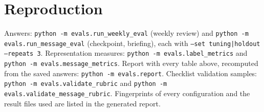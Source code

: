 \documentclass[10pt,twocolumn]{article}
\begin{document}
\section{Reproduction}
\label{app:repro}
Answers: \texttt{python -m evals.run\_weekly\_eval} (weekly review) and \texttt{python -m evals.run\_message\_eval}
(checkpoint, briefing), each with \texttt{--set tuning|holdout --repeats 3}. Representation measures:
\texttt{python -m evals.label\_metrics} and \texttt{python -m evals.message\_metrics}. Report with every table above,
recomputed from the saved answers: \texttt{python -m evals.report}. Checklist validation samples:
\texttt{python -m evals.validate\_rubric} and \texttt{python -m evals.validate\_message\_rubric}. Fingerprints of
every configuration and the result files used are listed in the generated report.
\end{document}
